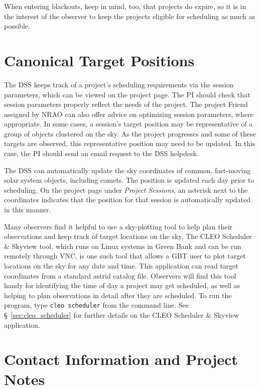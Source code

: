 When entering blackouts, keep in mind, too, that projects do expire, so it is in the interest
of the observer to keep the projects eligible for scheduling as much as possible.

\section{Canonical Target Positions}

The \gls{DSS} keeps track of a project's scheduling requirements via the session parameters,
which can be viewed on the project page. The \gls{PI} should check that session parameters
properly reflect the needs of the project. The project Friend assigned by NRAO can also
offer advice on optimizing session parameters, where appropriate. In some cases, a
session's target position may be representative of a group of objects clustered on the sky.
As the project progresses and some of these targets are observed, this representative
position may need to be updated. In this case, the \gls{PI} should send an email request to
the \gls{DSS} helpdesk.

The \gls{DSS} can automatically update the sky coordinates of common, fast-moving solar
system objects, including comets. The position is updated each day prior to scheduling.
On the project page under {\it Project Sessions}, an asterisk next to the coordinates indicates
that the position for that session is automatically updated in this manner.

Many observers find it helpful to use a sky-plotting tool to help plan their observations
and keep track of target locations on the sky. The \gls{CLEO} Scheduler \& Skyview tool, which
runs on Linux systems in Green Bank and can be run remotely through \gls{VNC}, is one such tool
that allows a \gls{GBT} user to plot target locations on the sky for any date and time. This
application can read target coordinates from a standard astrid catalog file. Observers will find
this tool handy for identifying the time of day a project may get scheduled, as well as helping to
plan observations in detail after they are scheduled. To run the program, type {\tt cleo scheduler}
from the command line. See \S~\ref{sec:cleo_scheduler} for further details on the \gls{CLEO}
Scheduler \& Skyview application.

\section{Contact Information and Project Notes}

